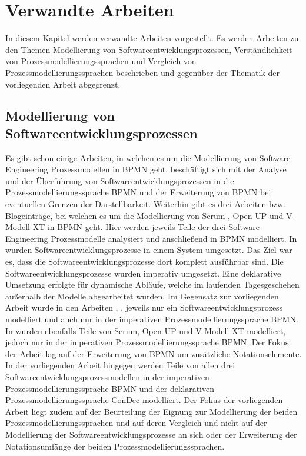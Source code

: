 \chapter{Verwandte Arbeiten}\label{sec:chapter9}

In diesem Kapitel werden verwandte Arbeiten vorgestellt. Es werden Arbeiten zu den Themen Modellierung von Softwareentwicklungsprozessen, Verständlichkeit von Prozessmodellierungssprachen und Vergleich von Prozessmodellierungssprachen beschrieben und gegenüber der Thematik der vorliegenden Arbeit abgegrenzt.

\section{Modellierung von Softwareentwicklungsprozessen}

Es gibt schon einige Arbeiten, in welchen es um die Modellierung von Software Engineering Prozessmodellen in BPMN geht.
\cite{Menhorn2014} beschäftigt sich mit der Analyse und der Überführung von Softwareentwicklungsprozessen in die Prozessmodellierungssprache BPMN und der Erweiterung von BPMN bei eventuellen Grenzen der Darstellbarkeit.\newline
Weiterhin gibt es drei Arbeiten bzw. Blogeinträge, bei welchen es um die Modellierung von Scrum \cite{software}, Open UP \cite{brunner2007fallstudie} und V-Modell XT \cite{Bregenzer2014} in BPMN geht. Hier werden jeweils Teile der drei Software-Engineering Prozessmodelle analysiert und anschließend in BPMN modelliert.\newline
In \cite{sabrina734, sabrina758, sabrina795} wurden Softwareentwicklungsprozesse in einem System umgesetzt. Das Ziel war es, dass die Softwareentwicklungsprozesse dort komplett ausführbar sind. Die Softwareentwicklungsprozesse wurden imperativ umgesetzt. Eine deklarative Umsetzung erfolgte für dynamische Abläufe, welche im laufenden Tagesgeschehen außerhalb der Modelle abgearbeitet wurden.
 Im Gegensatz zur vorliegenden Arbeit wurde in den Arbeiten \cite{software}, \cite{brunner2007fallstudie}, \cite{Bregenzer2014} jeweils nur ein Softwareentwicklungsprozess modelliert und auch nur in der imperativen Prozessmodellierungssprache BPMN. In \cite{Menhorn2014} wurden ebenfalls Teile von Scrum, Open UP und V-Modell XT modelliert, jedoch nur in der imperativen Prozessmodellierungssprache BPMN. Der Fokus der Arbeit \cite{Menhorn2014} lag auf der Erweiterung von BPMN um zusätzliche Notationselemente.\newline
 In der vorliegenden Arbeit hingegen werden Teile von allen drei Softwareentwicklungsprozessmodellen in der imperativen Prozessmodellierungssprache BPMN und der deklarativen Prozessmodellierungssprache ConDec modelliert. Der Fokus der vorliegenden Arbeit liegt zudem auf der Beurteilung der Eignung zur Modellierung der beiden Prozessmodellierungssprachen und auf deren Vergleich und nicht auf der Modellierung der Softwareentwicklungsprozesse an sich oder der Erweiterung der Notationsumfänge der beiden Prozessmodellierungssprachen.\newline
